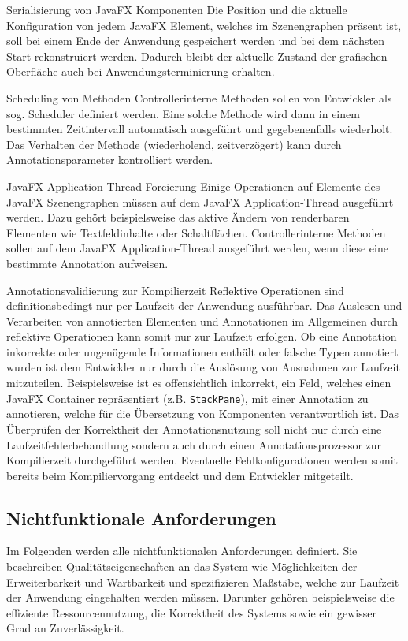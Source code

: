 \begin{freq}[o]{Serialisierung von JavaFX Komponenten}
	Die Position und die aktuelle Konfiguration von jedem JavaFX Element, welches im Szenengraphen präsent ist, soll bei einem Ende der Anwendung gespeichert werden und bei dem nächsten Start rekonstruiert werden. Dadurch bleibt der aktuelle Zustand der grafischen Oberfläche auch bei Anwendungsterminierung erhalten.
\end{freq}
\begin{freq}[o]{Scheduling von Methoden}
	Controllerinterne Methoden sollen von Entwickler als sog. Scheduler definiert werden. Eine solche Methode wird dann in einem bestimmten Zeitintervall automatisch ausgeführt und gegebenenfalls wiederholt. Das Verhalten der Methode (wiederholend, zeitverzögert) kann durch Annotationsparameter kontrolliert werden.
\end{freq}
\begin{freq}[o]{JavaFX Application-Thread Forcierung}
	Einige Operationen auf Elemente des JavaFX Szenengraphen müssen auf dem JavaFX Application-Thread ausgeführt werden. Dazu gehört beispielsweise das aktive Ändern von renderbaren Elementen wie Textfeldinhalte oder Schaltflächen. Controllerinterne Methoden sollen auf dem JavaFX Application-Thread ausgeführt werden, wenn diese eine bestimmte Annotation aufweisen.
\end{freq}
\begin{freq}[o]{Annotationsvalidierung zur Kompilierzeit}
	Reflektive Operationen sind definitionsbedingt nur per Laufzeit der Anwendung ausführbar. Das Auslesen und Verarbeiten von annotierten Elementen und Annotationen im Allgemeinen durch reflektive Operationen kann somit nur zur Laufzeit erfolgen. Ob eine Annotation inkorrekte oder ungenügende Informationen enthält oder falsche Typen annotiert wurden ist dem Entwickler nur durch die Auslösung von Ausnahmen zur Laufzeit mitzuteilen. Beispielsweise ist es offensichtlich inkorrekt, ein Feld, welches einen JavaFX Container repräsentiert (z.B. \texttt{StackPane}), mit einer Annotation zu annotieren, welche für die Übersetzung von Komponenten verantwortlich ist. Das Überprüfen der Korrektheit der Annotationsnutzung soll nicht nur durch eine Laufzeitfehlerbehandlung sondern auch durch einen Annotationsprozessor zur Kompilierzeit durchgeführt werden. Eventuelle Fehlkonfigurationen werden somit bereits beim Kompiliervorgang entdeckt und dem Entwickler mitgeteilt.
\end{freq}
\subsection{Nichtfunktionale Anforderungen}
\label{anforderungsanalyse_nichtfunktional}
Im Folgenden werden alle nichtfunktionalen Anforderungen definiert. Sie beschreiben Qualitätseigenschaften an das System wie Möglichkeiten der Erweiterbarkeit und Wartbarkeit und spezifizieren Maßstäbe, welche zur Laufzeit der Anwendung eingehalten werden müssen. Darunter gehören beispielsweise die effiziente Ressourcennutzung, die Korrektheit des Systems sowie ein gewisser Grad an Zuverlässigkeit.
